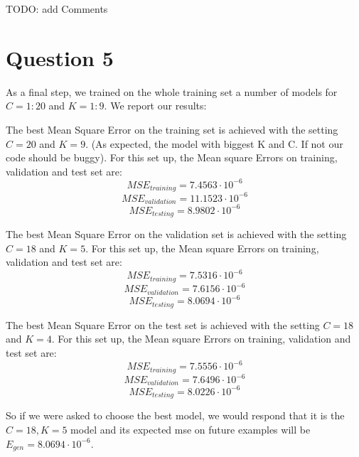 \documentclass{article}
\begin{document}
TODO: add Comments


\section{Question 5}

As a final step, we trained on the whole training set a number of models for $C = 1:20$ and $K = 1:9$. We report our results:

The best Mean Square Error on the training set is achieved with the setting $C=20$ and $K=9$. (As expected, the model with biggest K and C. If not our code should be buggy). For this set up, the Mean square Errors on training, validation and test set are: 
$$MSE_{training} = 7.4563 \cdot 10^{-6}$$
$$MSE_{validation} = 11.1523 \cdot 10^{-6}$$
$$MSE_{testing} = 8.9802 \cdot 10^{-6}$$

The best Mean Square Error on the validation set is achieved with the setting $C=18$ and $K=5$. For this set up, the Mean square Errors on training, validation and test set are: 
$$MSE_{training} = 7.5316 \cdot 10^{-6}$$
$$MSE_{validation} = 7.6156 \cdot 10^{-6}$$
$$MSE_{testing} = 8.0694 \cdot 10^{-6}$$

The best Mean Square Error on the test set is achieved with the setting $C=18$ and $K=4$. For this set up, the Mean square Errors on training, validation and test set are: 
$$MSE_{training} = 7.5556 \cdot 10^{-6}$$
$$MSE_{validation} = 7.6496 \cdot 10^{-6}$$
$$MSE_{testing} = 8.0226 \cdot 10^{-6}$$

So if we were asked to choose the best model, we would respond that it is the $C=18, K=5$ model and its expected mse on future examples will be $E_{gen} = 8.0694 \cdot 10^{-6}$.
\end{document}
